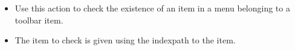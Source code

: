 
\begin{itemize}
\item Use this action to check the existence of an item in a menu belonging to a toolbar item.
\item The item to check is given using the indexpath to the item.
\end{itemize}
